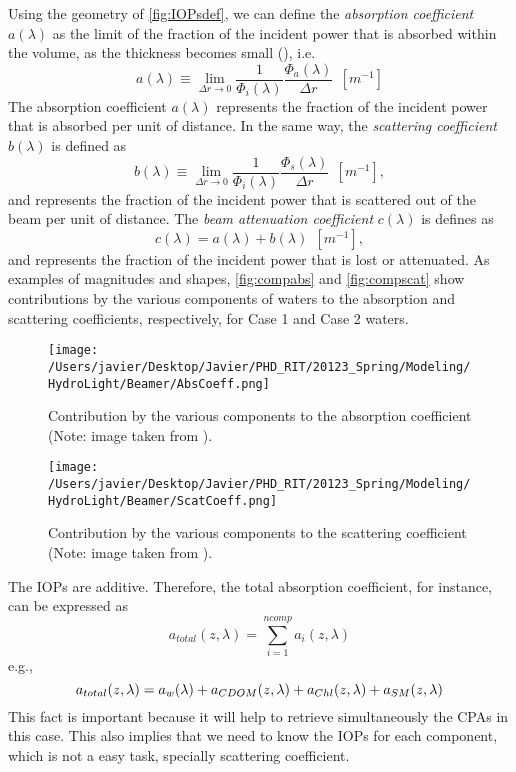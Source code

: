 Using the geometry of \autoref{fig:IOPsdef}, we can define the {\it absorption coefficient}  $a(\lambda)$ as the limit of the fraction of the incident power that is absorbed within the volume, as the thickness becomes small (\cite{Mobley:2001}), i.e.
\begin{equation}
  a(\lambda)\equiv \lim_{\Delta r\to 0} \frac{1}{\Phi_i(\lambda)}\frac{\Phi_a(\lambda)}{\Delta r}~~\left[m^{-1} \right]
\end{equation}
The absorption coefficient $a(\lambda)$ represents the fraction of the incident power that is absorbed per unit of distance. In the same way, the {\it scattering coefficient}  $b(\lambda)$ is defined as
\begin{equation}
  b(\lambda)\equiv \lim_{\Delta r\to 0} \frac{1}{\Phi_i(\lambda)}\frac{\Phi_s(\lambda)}{\Delta r}~~\left[m^{-1} \right],
\end{equation}
and represents the fraction of the incident power that is scattered out of the beam per unit of distance. The {\it beam attenuation coefficient}  $c(\lambda)$ is defines as
\begin{equation}
  c(\lambda)=a(\lambda)+b(\lambda)~~\left[m^{-1} \right],
\end{equation}
and represents the fraction of the incident power that is lost or attenuated. As examples of magnitudes and shapes, \autoref{fig:compabs} and \autoref{fig:compscat} show contributions by the various components of waters to the absorption and scattering coefficients, respectively, for Case 1 and Case 2 waters.
\begin{figure}[htb]
\centering
      \texttt{[image: /Users/javier/Desktop/Javier/PHD\_RIT/20123\_Spring/Modeling/HydroLight/Beamer/AbsCoeff.png]}
      \caption{Contribution by the various components to the absorption coefficient (Note: image taken from \cite{Mobley:2001}).}
      \label{fig:compabs}
\end{figure}

\begin{figure}[htb]
\centering
      \texttt{[image: /Users/javier/Desktop/Javier/PHD\_RIT/20123\_Spring/Modeling/HydroLight/Beamer/ScatCoeff.png]}
      \caption{Contribution by the various components to the scattering coefficient (Note: image taken from \cite{Mobley:2001}).}
      \label{fig:compscat}
\end{figure}

The IOPs are additive. Therefore, the total absorption coefficient, for instance, can be expressed as
\begin{equation}
  a_{total}(z,\lambda) = \sum_{i=1}^{ncomp} a_i(z,\lambda)
\end{equation}
e.g.,
\begin{equation}
  a_{total}(z,\lambda) =  a_w(\lambda) +a_{CDOM}(z,\lambda)+ a_{Chl}(z,\lambda)+a_{SM}(z,\lambda) \notag
\end{equation}
This fact is important because it will help to retrieve simultaneously the CPAs in this case. This also implies that we need to know the IOPs for each component, which is not a easy task, specially scattering coefficient.

